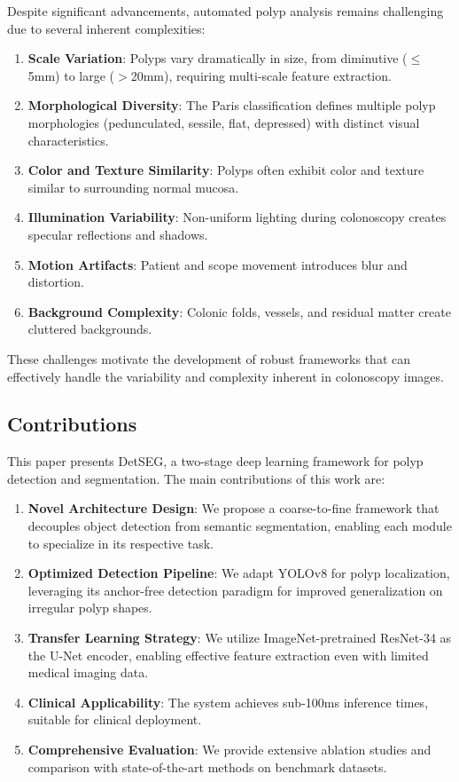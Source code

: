 \documentclass[conference]{IEEEtran}
\begin{document}
Despite significant advancements, automated polyp analysis remains challenging due to several inherent complexities:

\begin{enumerate}
    \item \textbf{Scale Variation}: Polyps vary dramatically in size, from diminutive ($\leq$5mm) to large ($>$20mm), requiring multi-scale feature extraction.
    \item \textbf{Morphological Diversity}: The Paris classification defines multiple polyp morphologies (pedunculated, sessile, flat, depressed) with distinct visual characteristics.
    \item \textbf{Color and Texture Similarity}: Polyps often exhibit color and texture similar to surrounding normal mucosa.
    \item \textbf{Illumination Variability}: Non-uniform lighting during colonoscopy creates specular reflections and shadows.
    \item \textbf{Motion Artifacts}: Patient and scope movement introduces blur and distortion.
    \item \textbf{Background Complexity}: Colonic folds, vessels, and residual matter create cluttered backgrounds.
\end{enumerate}

These challenges motivate the development of robust frameworks that can effectively handle the variability and complexity inherent in colonoscopy images.

\subsection{Contributions}

This paper presents DetSEG, a two-stage deep learning framework for polyp detection and segmentation. The main contributions of this work are:

\begin{enumerate}
    \item \textbf{Novel Architecture Design}: We propose a coarse-to-fine framework that decouples object detection from semantic segmentation, enabling each module to specialize in its respective task.
    \item \textbf{Optimized Detection Pipeline}: We adapt YOLOv8 for polyp localization, leveraging its anchor-free detection paradigm for improved generalization on irregular polyp shapes.
    \item \textbf{Transfer Learning Strategy}: We utilize ImageNet-pretrained ResNet-34 as the U-Net encoder, enabling effective feature extraction even with limited medical imaging data.
    \item \textbf{Clinical Applicability}: The system achieves sub-100ms inference times, suitable for clinical deployment.
    \item \textbf{Comprehensive Evaluation}: We provide extensive ablation studies and comparison with state-of-the-art methods on benchmark datasets.
\end{enumerate}
\end{document}
